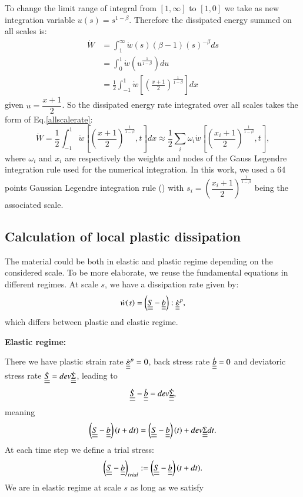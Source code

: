 \documentclass[3p,times,procedia,number]{elsarticle}
\begin{document}
\noindent
To change the limit range of integral from $[1,\infty]$ to $[1,0]$ we take as new integration variable
$u(s)= s^{1-\beta}$. Therefore the dissipated energy summed on all scales is:
\begin{equation}
\begin{split}
\dot{W}&=\int_{1}^{\infty}\dot{w}(s) (\beta-1)(s)^{-\beta}ds
\\&=\int_{0}^{1}\dot{w}\left( u^{\frac{1}{1-\beta}}\right)du
\\&=\frac{1}{2}\int_{-1}^{1}\dot{w}\left[  \left( \frac{x+1}{2}\right) ^{\frac{1}{1-\beta}}\right] dx
\end{split}
\label{allscale}
\end{equation}
given $u=\dfrac{x+1}{2}$. So the dissipated energy rate integrated over all scales takes the form of Eq.\eqref{allscalerate}:
\begin{equation}
\dot{W}=\frac{1}{2}\int_{-1}^{1}\dot{w}\left[  \left( \frac{x+1}{2}\right) ^{\frac{1}{1-\beta}},t\right] dx\approx\frac{1}{2}\sum_{i}\omega_i\dot{w}\left[  \left( \frac{x_i+1}{2}\right) ^{\frac{1}{1-\beta}},t\right],
\label{allscalerate}
\end{equation}
where $\omega_i$ and $x_i$ are respectively the weights and nodes of the Gauss Legendre integration rule used for the numerical integration.  In this work, we used a 64 points Gaussian Legendre integration rule (\cite{Legendre}) with $s_i=\left( \dfrac{x_i+1}{2}\right) ^{\frac{1}{1-\beta}}$ being the associated scale.

\subsection{Calculation of local plastic dissipation}
\label{sec:5.4.4}
The material could be both in elastic and plastic regime depending on the considered scale. To be more elaborate, we reuse the fundamental equations in different regimes. At scale $s$, we have a dissipation rate given by:
$$\dot{w}(s)=\left( \uline{\uline{S}}-\uline{\uline{b}}\right):\dot{\uline{\uline{\varepsilon}}}^p, $$
which differs between plastic and elastic regime.

\vspace{6pt}
\noindent
\textbf{Elastic regime:}

\vspace{6pt}
\noindent
There we have
plastic strain rate
$\dot{\uline{\uline{\varepsilon}}}^p=0$, back stress rate $\dot{\uline{\uline{b}}}=0$ and deviatoric stress rate $\dot{\uline{\uline{S}}}=dev\dot{\uline{\uline{\Sigma}}}$, leading to
$$\dot{\uline{\uline{S}}}-\dot{\uline{\uline{b}}}=dev\dot{\uline{\uline{\Sigma}}},$$ 
meaning
$$\left( \uline{\uline{S}}-\uline{\uline{b}}\right) (t+dt)=\left( \uline{\uline{S}}-\uline{\uline{b}}\right) (t)+dev\dot{\uline{\uline{\Sigma}}}dt.$$
At each time step we define a trial stress:
\begin{equation}
\left( \uline{\uline{S}}-\uline{\uline{b}}\right)_{trial}:=\left( \uline{\uline{S}}-\uline{\uline{b}}\right)(t+dt).
\label{trial}
\end{equation}
We are in elastic regime at scale $s$ as long as we satisfy
\end{document}
